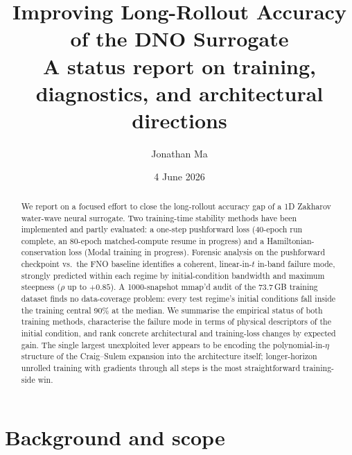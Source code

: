 \documentclass[11pt,letterpaper]{article}
\title{\textbf{Improving Long-Rollout Accuracy of the DNO Surrogate}\\[2pt]
       \large A status report on training, diagnostics, and architectural directions}
\author{Jonathan Ma}
\date{4 June 2026}
\begin{document}
\maketitle

\begin{abstract}
\noindent
We report on a focused effort to close the long-rollout accuracy gap of a
1D Zakharov water-wave neural surrogate. Two training-time stability
methods have been implemented and partly evaluated: a one-step
pushforward loss (40-epoch run complete, an 80-epoch matched-compute
resume in progress) and a Hamiltonian-conservation loss (Modal training
in progress). Forensic analysis on the pushforward checkpoint vs.\ the
FNO baseline identifies a coherent, linear-in-$t$ in-band failure mode,
strongly predicted within each regime by initial-condition bandwidth and
maximum steepness ($\rho$ up to $+0.85$). A 1000-snapshot mmap'd audit
of the 73.7\,GB training dataset finds no data-coverage problem: every
test regime's initial conditions fall inside the training central 90\%
at the median. We summarise the empirical status of both training
methods, characterise the failure mode in terms of physical descriptors
of the initial condition, and rank concrete architectural and
training-loss changes by expected gain. The single largest unexploited
lever appears to be encoding the polynomial-in-$\eta$ structure of the
Craig--Sulem expansion into the architecture itself; longer-horizon
unrolled training with gradients through all steps is the most
straightforward training-side win.
\end{abstract}

\section{Background and scope}
\end{document}
